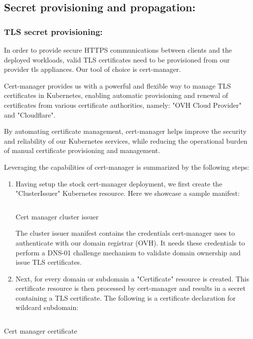 \subsection{Secret provisioning and propagation:}

\subsubsection{TLS secret provisioning:}

In order to provide secure HTTPS communications between clients and the deployed workloads, valid TLS certificates need to be provisioned from our provider tls appliances. Our tool of choice is cert-manager.

Cert-manager provides us with a powerful and flexible way to manage TLS certificates in Kubernetes, enabling automatic provisioning and renewal of certificates from various certificate authorities, namely: "OVH Cloud Provider" and "Cloudflare".

By automating certificate management, cert-manager helps improve the security and reliability of our Kubernetes services, while reducing the operational burden of manual certificate provisioning and management.

Leveraging the capabilities of cert-manager is summarized by the following steps:

\begin{enumerate}
    \item  Having setup the stock cert-manager deployment, we first create the "ClusterIssuer" Kubernetes resource. Here we showcase a sample manifest:
        \begin{listing}[H]
        \inputminted{Yaml}{codeListing/cert_manager_cluster_issuer.yml}
        \caption{Cert manager cluster issuer}
        \label{lst:the-code}
        \end{listing}
    The cluster issuer manifest contains the credentials cert-manager uses to authenticate with our domain registrar (OVH). It needs these credentials to perform a DNS-01 challenge mechanism to validate domain ownership and issue TLS certificates.
    \item Next, for every domain or subdomain a "Certificate" resource is created. This certificate resource is then processed by cert-manager and results in a secret containing a TLS certificate. The following is a certificate declaration for wildcard subdomain:

\end{enumerate}
\begin{listing}[H]
\inputminted{Yaml}{codeListing/cert_manager_certificate.yml}
\caption{Cert manager certificate }
\label{lst:certificate}
\end{listing}
